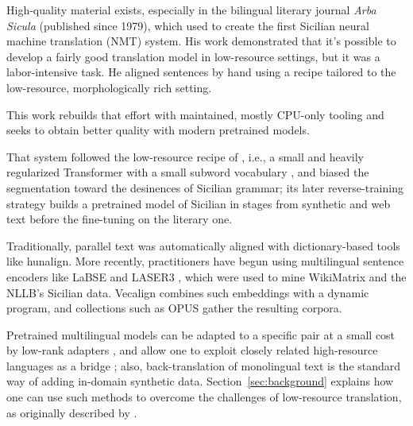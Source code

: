\documentclass[11pt,a4paper]{article}
\begin{document}
High-quality material exists, especially in the bilingual literary journal \emph{Arba Sicula}
(published since 1979), which \citet{wdowiak2022loresnmt} used to create
the first Sicilian neural machine translation (NMT) system.
His work demonstrated that it's possible to develop a fairly good translation model
in low-resource settings, but it was a labor-intensive task.
He aligned sentences by hand using a recipe tailored to the
low-resource, morphologically rich setting.

This work rebuilds that effort with maintained,
mostly CPU-only tooling and seeks to obtain better quality
with modern pretrained models.



That system \citep{wdowiak2021recipe,wdowiak2022loresnmt} followed the low-resource
recipe of \citet{sennrich2019loresnmt}, i.e., a small and heavily regularized Transformer
\citep{vaswani2017attention} with a small subword vocabulary \citep{sennrich2016subword},
and biased the segmentation toward the desinences of Sicilian grammar;
its later reverse-training strategy \citep{wdowiakreverse}
builds a pretrained model of Sicilian in stages from synthetic and web text
before the fine-tuning on the literary one.

Traditionally, parallel text was automatically aligned with dictionary-based tools like hunalign.
More recently, practitioners have begun using multilingual sentence encoders
like LaBSE \citep{feng2022labse} and LASER3 \citep{heffernan2022laser3},
which were used to mine WikiMatrix \citep{schwenk2021wikimatrix} and the NLLB's Sicilian data.
Vecalign \citep{thompson2019vecalign} combines such embeddings with a dynamic program,
and collections such as OPUS \citep{tiedemann2012} gather the resulting corpora.

Pretrained multilingual models can be adapted to a specific pair at a small cost by low-rank
adapters \citep{hu2021lora}, and allow one to exploit closely related high-resource languages as
a bridge \citep{johnson2017zeroshot,arivazhagan2019massively,fan2020beyond,zhang2020improving};
also, back-translation of monolingual text \citep{sennrich2015backtrans} is the standard way of
adding in-domain synthetic data.  Section~\ref{sec:background} explains how one can use
such methods to overcome the challenges of low-resource translation,
as originally described by \citet{koehnknowles2017}.
\end{document}

